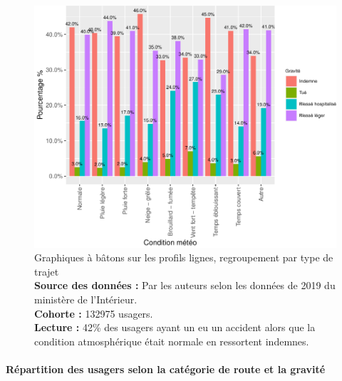 \documentclass[french,]{tp}
\let\oldparagraph\paragraph
\renewcommand{\paragraph}[1]{\oldparagraph{#1}\mbox{}}
\begin{document}
\begin{figure}[ht!]

{\centering \includegraphics{Prediction_Gravite_files/figure-latex/barplotatm-1} 

}

\caption{Graphiques à bâtons sur les profils lignes, regroupement par type de trajet\\
\textbf{Source des données :} Par les auteurs selon les données de 2019 du ministère de l'Intérieur.\\
\textbf{Cohorte :} 132975 usagers.\\
\textbf{Lecture :} 42\% des usagers ayant un eu un accident alors que la condition atmosphérique était normale en ressortent indemnes.}\label{fig:barplotatm}
\end{figure}

\hypertarget{ruxe9partition-des-usagers-selon-la-catuxe9gorie-de-route-et-la-gravituxe9}{%
\paragraph{Répartition des usagers selon la catégorie de route et la gravité}\label{ruxe9partition-des-usagers-selon-la-catuxe9gorie-de-route-et-la-gravituxe9}}
\end{document}
